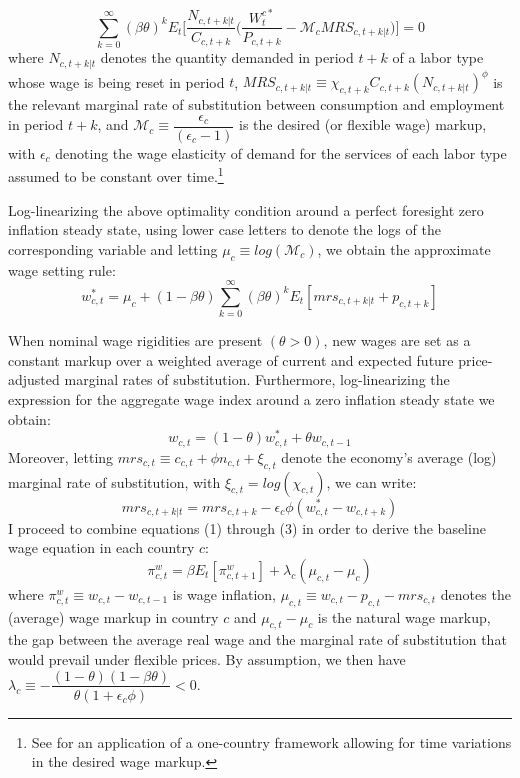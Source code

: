 \documentclass[12pt]{article}
\begin{document}
\begin{appendices}
\begin{equation*}
    \sum_{k=0}^{\infty} (\beta \theta)^k E_t \Bigg[ \frac{N_{c,t+k|t}}{C_{c,t+k}} \Bigg( \dfrac{W_t^{c*}}{P_{c,t+k}} - \mathcal{M}_c MRS_{c,t+k|t} \Bigg) \Bigg] = 0
\end{equation*}
where $N_{c,t+k|t}$ denotes the quantity demanded in period $t+k$ of a labor type whose wage is being reset in period $t$, $MRS_{c,t+k|t} \equiv \chi_{c,t+k} C_{c,t+k} (N_{c,t+k|t})^\phi$ is the relevant marginal rate of substitution between consumption and employment in period $t+k$, and $\mathcal{M}_c \equiv \dfrac{\epsilon_c}{(\epsilon_c - 1)}$ is the desired (or flexible wage) markup, with $\epsilon_c$ denoting the wage elasticity of demand for the services of each labor type assumed to be constant over time.\footnote{See \cite{Gali2012} for an application of a one-country framework allowing for time variations in the desired wage markup.}

Log-linearizing the above optimality condition around a perfect foresight zero inflation steady state, using lower case letters to denote the logs of the corresponding variable and letting $\mu_c \equiv log(\mathcal{M}_c)$, we obtain the approximate wage setting rule:
\begin{equation}
    w_{c,t}^{*} = \mu_c + (1-\beta \theta) \sum_{k=0}^{\infty} (\beta \theta)^k E_t [mrs_{c,t+k|t}+p_{c,t+k}] 
\end{equation}

When nominal wage rigidities are present $(\theta > 0)$, new wages are set as a constant markup over a weighted average of current and expected future price-adjusted marginal rates of substitution. Furthermore, log-linearizing the expression for the aggregate wage index around a zero inflation steady state we obtain:
\begin{equation}
    w_{c,t} = (1-\theta)w_{c,t}^* + \theta w_{c,t-1}
\end{equation}
Moreover, letting $mrs_{c,t} \equiv c_{c,t} + \phi n_{c,t} + \xi_{c,t}$ denote the economy’s average (log) marginal rate of substitution, with $\xi_{c,t} = log(\chi_{c,t})$, we can write:
\begin{equation}
    mrs_{c,t+k|t} = mrs_{c,t+k} - \epsilon_c \phi (w_{c,t}^* - w_{c,t+k})
\end{equation}
I proceed to combine equations (1) through (3) in order to derive the baseline wage equation in each country $c$:
\begin{equation}
    \label{EQ_baseline}
    \pi_{c,t}^{w} = \beta E_t [\pi_{c,t+1}^{w}] + \lambda_c (\mu_{c,t} - \mu_c)
\end{equation}
where $\pi_{c,t}^{w} \equiv w_{c,t} - w_{c,t-1}$ is wage inflation, $\mu_{c,t} \equiv w_{c,t} - p_{c,t} - mrs_{c,t}$ denotes the (average) wage markup in country $c$ and $\mu_{c,t} - \mu_c$ is the natural wage markup, the gap between the average real wage and the marginal rate of substitution that would prevail under flexible prices. By assumption, we then have $\lambda_c \equiv - \dfrac{(1-\theta)(1-\beta \theta)}{\theta (1+\epsilon_c \phi)} < 0$. 


\end{appendices}
\end{document}
